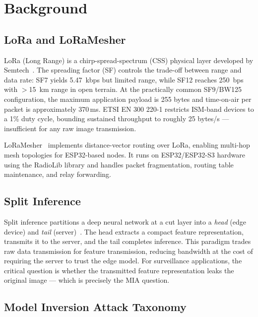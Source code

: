 \documentclass[journal]{IEEEtran}
\begin{document}
\section{Background}
\label{sec:background}

\subsection{LoRa and LoRaMesher}

LoRa (Long Range) is a chirp-spread-spectrum (CSS) physical layer
developed by Semtech~\cite{LoRaSpec2015}.
The spreading factor (SF) controls the trade-off between range and
data rate: SF7 yields \SI{5.47}{kbps} but limited range, while SF12
reaches \SI{250}{bps} with $>$\SI{15}{km} range in open terrain.
At the practically common SF9/BW125 configuration, the maximum
application payload is 255 bytes and time-on-air per packet is
approximately 370\,ms.
ETSI EN 300 220-1 restricts ISM-band devices to a 1\% duty cycle,
bounding sustained throughput to roughly 25 bytes/s --- insufficient
for any raw image transmission.

LoRaMesher~\cite{LoRaMesher2023} implements distance-vector routing
over LoRa, enabling multi-hop mesh topologies for ESP32-based nodes.
It runs on ESP32/ESP32-S3 hardware using the RadioLib library and
handles packet fragmentation, routing table maintenance, and relay
forwarding.

\subsection{Split Inference}

Split inference partitions a deep neural network at a cut layer into
a \emph{head} (edge device) and \emph{tail} (server)~\cite{Matsubara2022}.
The head extracts a compact feature representation, transmits it to
the server, and the tail completes inference.
This paradigm trades raw data transmission for feature transmission,
reducing bandwidth at the cost of requiring the server to trust the
edge model.
For surveillance applications, the critical question is whether the
transmitted feature representation leaks the original image --- which
is precisely the MIA question.

\subsection{Model Inversion Attack Taxonomy}
\end{document}
